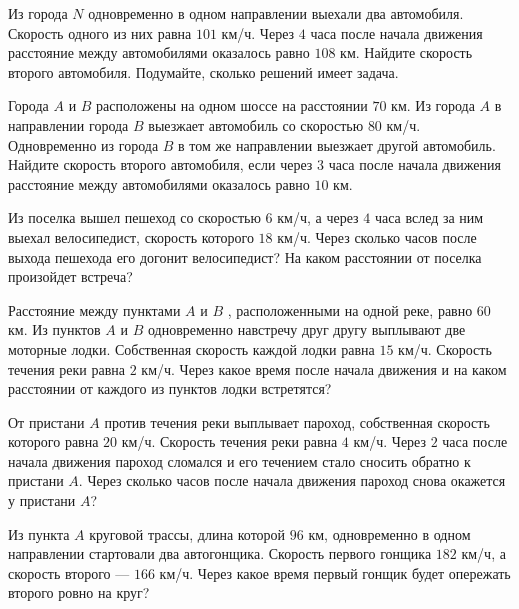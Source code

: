 \begin{listofex}
	\item Из города \( N \) одновременно в одном направлении выехали два автомобиля. Скорость
	одного из них равна \( 101 \) км/ч. Через \( 4 \) часа после начала движения расстояние между
	автомобилями оказалось равно \( 108 \) км. Найдите скорость второго автомобиля. Подумайте,
	сколько решений имеет задача.
	\item Города \( A \) и \( B \) расположены на одном шоссе на расстоянии \( 70 \) км. Из города \( A \) в направлении города \( B \) выезжает автомобиль со скоростью \( 80 \) км/ч. Одновременно из города \( B \) в том же направлении выезжает другой автомобиль. Найдите скорость второго автомобиля, если через \( 3 \) часа после начала движения расстояние между автомобилями оказалось равно \( 10 \) км.
	\item Из поселка вышел пешеход со скоростью \( 6 \) км/ч, а через \( 4 \) часа вслед за ним выехал велосипедист, скорость которого \( 18 \) км/ч. Через сколько часов после выхода пешехода его догонит велосипедист? На каком расстоянии от поселка произойдет встреча?
	\item Расстояние между пунктами \( A \) и \( B \) , расположенными на одной реке, равно \( 60 \) км. Из пунктов \( A \) и \( B \) одновременно навстречу друг другу выплывают две моторные лодки. Собственная скорость каждой лодки равна \( 15 \) км/ч. Скорость течения реки равна \( 2 \) км/ч. Через какое время после начала движения и на каком расстоянии от каждого из пунктов лодки встретятся?
	\item От пристани \( A \) против течения реки выплывает пароход, собственная скорость которого равна \( 20 \) км/ч. Скорость течения реки равна \( 4 \) км/ч. Через \( 2 \) часа
	после начала движения пароход сломался и его течением стало сносить обратно к пристани \( A \).
	Через сколько часов после начала движения пароход снова окажется у пристани \( A \)?
	\item Из пункта \( A \) круговой трассы, длина которой \( 96 \) км, одновременно в одном направлении стартовали два автогонщика. Скорость первого гонщика \( 182 \) км/ч, а скорость
	второго --- \( 166 \) км/ч. Через какое время первый гонщик будет опережать второго ровно на круг?
\end{listofex}
